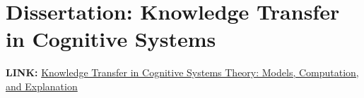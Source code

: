 \documentclass[11pt, oneside]{article}   	%
\begin{document}













\section{Dissertation: Knowledge Transfer in Cognitive Systems}

\noindent \textbf{LINK:} \href{https://edoc.ub.uni-muenchen.de/28655/}{Knowledge Transfer in Cognitive Systems Theory: Models, Computation, and Explanation} \\




\end{document}
